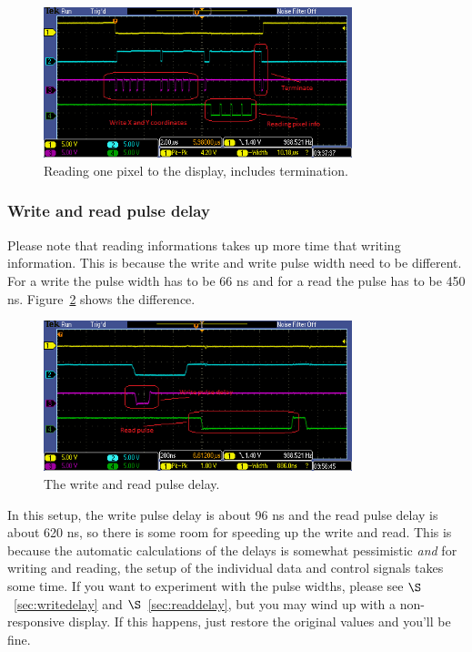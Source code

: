 \documentclass[12pt]{article}
\begin{document}
\begin{figure}[!ht]
\centering
\includegraphics[width=0.8\textwidth]{pixel_read}
\caption{Reading one pixel to the display, includes termination.}
\label{fig:11}
\end{figure}

\subsubsection{Write and read pulse delay}
Please note that reading informations takes up more time that writing information. This is because the write and write pulse width need to be different. For a write the pulse width has to be 66 ns and for a read the pulse has to be 450 ns. Figure~\ref{fig:12} shows the difference.

\begin{figure}[!ht]
\centering
\includegraphics[width=0.8\textwidth]{write_read_delay}
\caption{The write and read pulse delay.}
\label{fig:12}
\end{figure}

In this setup, the write pulse delay is about 96 ns and the read pulse delay is about 620 ns, so there is some room for speeding up the write and read. This is because the automatic calculations of the delays is somewhat pessimistic \textsl{and} for writing and reading, the setup of the individual data and control signals takes some time. If you want to experiment with the pulse widths, please see $\S$~\ref{sec:writedelay} and $\S$~\ref{sec:readdelay}, but you may wind up with a non-responsive display. If this happens, just restore the original values and you'll be fine.
\end{document}
